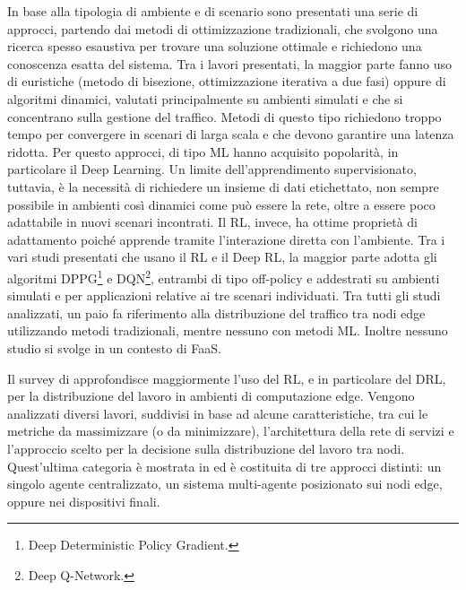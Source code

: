 In base alla tipologia di ambiente e di scenario sono presentati una serie di approcci, partendo dai metodi di ottimizzazione tradizionali, che svolgono una ricerca spesso esaustiva per trovare una soluzione ottimale e richiedono una conoscenza esatta del sistema. Tra i lavori presentati, la maggior parte fanno uso di euristiche (metodo di bisezione, ottimizzazione iterativa a due fasi) oppure di algoritmi dinamici, valutati principalmente su ambienti simulati e che si concentrano sulla gestione del traffico. Metodi di questo tipo richiedono troppo tempo per convergere in scenari di larga scala e che devono garantire una latenza ridotta. Per questo approcci, di tipo ML hanno acquisito popolarità, in particolare il Deep Learning. Un limite dell'apprendimento supervisionato, tuttavia, è la necessità di richiedere un insieme di dati etichettato, non sempre possibile in ambienti così dinamici come può essere la rete, oltre a essere poco adattabile in nuovi scenari incontrati. Il RL, invece, ha ottime proprietà di adattamento poiché apprende tramite l'interazione diretta con l'ambiente. Tra i vari studi presentati che usano il RL e il Deep RL, la maggior parte adotta gli algoritmi DPPG\footnote{Deep Deterministic Policy Gradient.} e DQN\footnote{Deep Q-Network.}, entrambi di tipo off-policy e addestrati su ambienti simulati e per applicazioni relative ai tre scenari individuati. Tra tutti gli studi analizzati, un paio fa riferimento alla distribuzione del traffico tra nodi edge utilizzando metodi tradizionali, mentre nessuno con metodi ML. Inoltre nessuno studio si svolge in un contesto di FaaS.

Il survey di \cite{Hortelano2023} approfondisce maggiormente l'uso del RL, e in particolare del DRL, per la distribuzione del lavoro in ambienti di computazione edge. Vengono analizzati diversi lavori, suddivisi in base ad alcune caratteristiche, tra cui le metriche da massimizzare (o da minimizzare), l'architettura della rete di servizi e l'approccio scelto per la decisione sulla distribuzione del lavoro tra nodi. Quest'ultima categoria è mostrata in  ed è costituita di tre approcci distinti: un singolo agente centralizzato, un sistema multi-agente posizionato sui nodi edge, oppure nei dispositivi finali.

